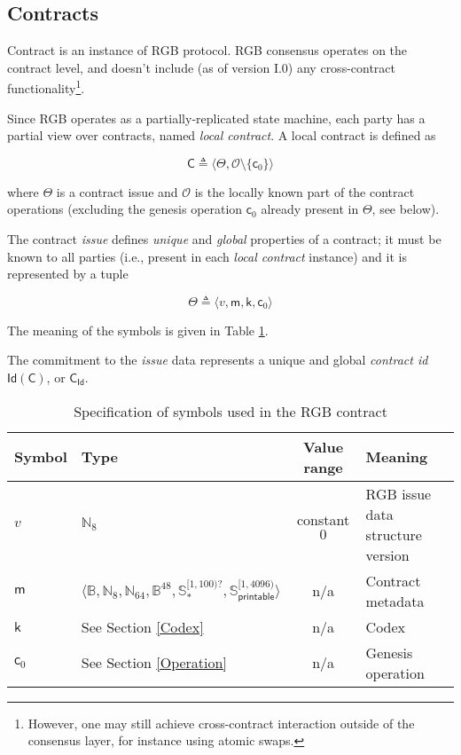 \documentclass[a4paper]{article}
\begin{document}
\begin{multicols}{2}
\section{Contracts}

Contract is an instance of RGB protocol. RGB consensus operates on the contract level,
and doesn't include (as of version I.0) any cross-contract functionality\footnote{%
However, one may still achieve cross-contract interaction outside of the consensus layer,
for instance using atomic swaps.}.

Since RGB operates as a partially-replicated state machine,
each party has a partial view over contracts, named \emph{local contract}. 
A local contract is defined as

\begin{equation}
\mathsf{C} \triangleq \langle \mathsf{\Theta}, \mathcal{O} \setminus \{ \mathsf{c}_0 \} \rangle
\end{equation}

where $\Theta$ is a contract issue and
$\mathcal{O}$ is the locally known part of the contract operations
(excluding the genesis operation $\mathsf{c}_0$ already present in $\Theta$, see below).

The contract \emph{issue} defines \emph{unique} and \emph{global} properties of a contract;
it must be known to all parties (i.e., present in each \emph{local contract} instance) and
it is represented by a tuple

\begin{equation}
\mathsf{\Theta} \triangleq \langle v, \mathsf{m}, \mathsf{k}, \mathsf{c}_0 \rangle
\end{equation}

The meaning of the symbols is given in Table \ref{tab:contract}.

The commitment to the \emph{issue} data represents a unique and global \emph{contract id}
$\mathsf{Id}(\mathsf{C})$, or $\mathsf{C_{Id}}$.

\end{multicols}
\begin{table}[h]
\centering
\caption{Specification of symbols used in the RGB contract}\label{tab:contract}
\begin{tabular}{ l l c l }
\toprule
Symbol & Type & Value range & Meaning \\
\midrule
$v$ & $\mathbb{N}_8$ & constant $0$ & RGB issue data structure version \\
$\mathsf{m}$   & $\langle \mathbb{B}, \mathbb{N}_8, \mathbb{N}_{64}, \mathbb{B}^{48}, \mathbb{S}_*^{[1, 100)?}, \mathbb{S}_\mathsf{printable}^{[1, 4096)} \rangle$ & n/a          & Contract metadata \\
$\mathsf{k}$   & See Section \ref{Codex} & n/a & Codex \\
$\mathsf{c}_0$ & See Section \ref{Operation} & n/a & Genesis operation \\
\bottomrule
\end{tabular}
\end{table}
\end{document}
